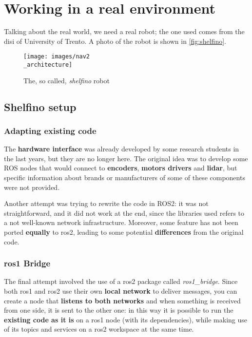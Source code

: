 
\chapter{Working in a real environment}
\label{cha:realworld}

Talking about the real world, we need a real robot; the one used comes from the \acrfull{disi} of University of Trento.
A photo of the robot is shown in \autoref{fig:shelfino}. %

\begin{figure}[h]
  \centering
  \texttt{[image: images/nav2\\\_architecture]}
  \caption{The, so called, \textit{shelfino} robot}
  \label{fig:shelfino}
\end{figure}

\section{Shelfino setup} 

\subsection{Adapting existing code}

The \textbf{hardware interface} was already developed by some research students in the last years, but they are no longer here. The original idea was to develop some ROS nodes that would connect to \textbf{encoders}, \textbf{motors drivers} and \textbf{lidar}, but specific information about brands or manufacturers of some of these components were not provided.

Another attempt was trying to rewrite the code in ROS2: it was not straightforward, and it did not work at the end, since the libraries used refers to a not well-known network infrastructure. Moreover, some feature has not been ported \textbf{equally} to \acrshort{ros}2, leading to some potential \textbf{differences} from the original code.

\subsection{\acrshort{ros}1 Bridge}

The final attempt involved the use of a \acrshort{ros}2 package called \textit{ros1\_bridge}. Since both \acrshort{ros}1 and \acrshort{ros}2 use their own \textbf{local network} to deliver messages, you can create a node that \textbf{listens to both networks} and when something is received from one side, it is sent to the other one: in this way it is possible to run the \textbf{existing code as it is} on a \acrshort{ros}1 node (with its dependencies), while making use of its topics and services on a \acrshort{ros}2 workspace at the same time.

